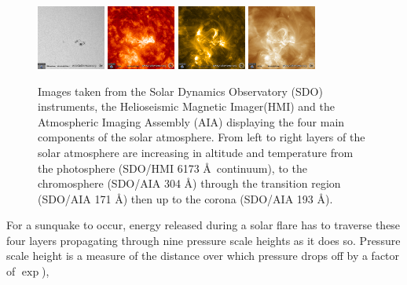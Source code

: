 \begin{figure}[H]%
  \begin{center}
  \includegraphics[width=0.20\textwidth]{2014_03_29_17_19_42_HMI_Int}%
  \includegraphics[width=0.20\textwidth]{2014_03_29_17_19_42_AIA_304}%
  \includegraphics[width=0.20\textwidth]{2014_03_29_17_19_42_AIA_171}%
  \includegraphics[width=0.20\textwidth]{2014_03_29_17_19_42_AIA_193}%
  \caption{ Images taken from the Solar Dynamics Observatory (SDO) instruments, the Helioseismic Magnetic Imager(HMI) and the Atmospheric Imaging Assembly (AIA) displaying the four main components of the solar atmosphere. From left to right layers of the solar atmosphere are increasing in altitude and temperature from the photosphere (SDO/HMI 6173 \AA\ continuum), to the chromosphere (SDO/AIA 304 \AA) through the transition region (SDO/AIA 171 \AA) then up to the corona (SDO/AIA 193 \AA).}\label{solatmpics}
\end{center}
\end{figure}


For a sunquake to occur, energy released during a solar flare has to traverse these four layers propagating through nine pressure scale heights as it does so. Pressure scale height is a measure of the distance over which pressure drops off by a factor of $\exp$), 


